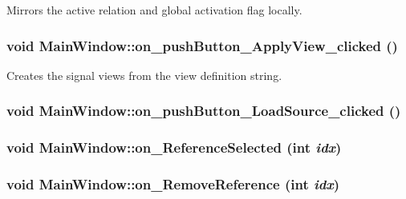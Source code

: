 Mirrors the active relation and global activation flag locally. \hypertarget{class_main_window_aca5397b0d3a14c821570104806aeafc}{
\subsubsection[{on\_\-pushButton\_\-ApplyView\_\-clicked}]{\setlength{\rightskip}{0pt plus 5cm}void MainWindow::on\_\-pushButton\_\-ApplyView\_\-clicked ()}}
\label{class_main_window_aca5397b0d3a14c821570104806aeafc}


Creates the signal views from the view definition string. 

\hypertarget{class_main_window_86b907774ebb8fb294e443f25526e7df}{
\subsubsection[{on\_\-pushButton\_\-LoadSource\_\-clicked}]{\setlength{\rightskip}{0pt plus 5cm}void MainWindow::on\_\-pushButton\_\-LoadSource\_\-clicked ()}}
\label{class_main_window_86b907774ebb8fb294e443f25526e7df}


\hypertarget{class_main_window_025bb12a52e1396bedb251e87d237fff}{
\subsubsection[{on\_\-ReferenceSelected}]{\setlength{\rightskip}{0pt plus 5cm}void MainWindow::on\_\-ReferenceSelected (int {\em idx})}}
\label{class_main_window_025bb12a52e1396bedb251e87d237fff}


\hypertarget{class_main_window_81e2078a2e42c24daeda9d87ae6b97c5}{
\subsubsection[{on\_\-RemoveReference}]{\setlength{\rightskip}{0pt plus 5cm}void MainWindow::on\_\-RemoveReference (int {\em idx})}}
\label{class_main_window_81e2078a2e42c24daeda9d87ae6b97c5}


